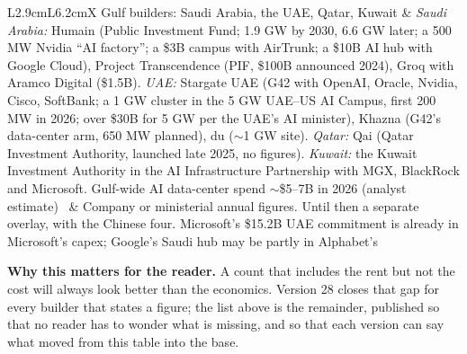 \documentclass[11pt,letterpaper]{article}
\newcommand{\lead}[1]{{\color{leadwarm}\sffamily\bfseries #1}}
\begin{document}
\begin{table}[htbp]
\begin{tabularx}{\textwidth}{L{2.9cm}L{6.2cm}X}
Gulf builders: Saudi Arabia, the UAE, Qatar, Kuwait & \emph{Saudi Arabia:} Humain (Public Investment Fund; 1.9 GW by 2030, 6.6 GW later; a 500 MW Nvidia ``AI factory''; a \$3B campus with AirTrunk; a \$10B AI hub with Google Cloud), Project Transcendence (PIF, \$100B announced 2024), Groq with Aramco Digital (\$1.5B). \emph{UAE:} Stargate UAE (G42 with OpenAI, Oracle, Nvidia, Cisco, SoftBank; a 1 GW cluster in the 5 GW UAE--US AI Campus, first 200 MW in 2026; over \$30B for 5 GW per the UAE's AI minister), Khazna (G42's data-center arm, 650 MW planned), du ($\sim$1 GW site). \emph{Qatar:} Qai (Qatar Investment Authority, launched late 2025, no figures). \emph{Kuwait:} the Kuwait Investment Authority in the AI Infrastructure Partnership with MGX, BlackRock and Microsoft. Gulf-wide AI data-center spend $\sim$\$5--7B in 2026 (analyst estimate)~\cite{ref:gulf_projects,ref:gulfnews_stargate_uae,ref:agbi_stargate_uae,ref:analysys_gcc} & Company or ministerial annual figures. Until then a separate overlay, with the Chinese four. Microsoft's \$15.2B UAE commitment is already in Microsoft's capex; Google's Saudi hub may be partly in Alphabet's \\
\bottomrule
\end{tabularx}
\end{table}

\lead{Why this matters for the reader.} A count that includes the rent but not the cost will always look better than the economics. Version 28 closes that gap for every builder that states a figure; the list above is the remainder, published so that no reader has to wonder what is missing, and so that each version can say what moved from this table into the base.
\end{document}
